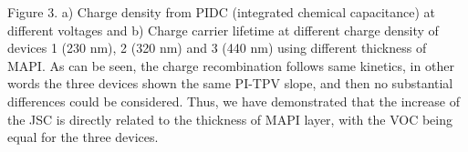 %

Figure 3. a) Charge density from PIDC (integrated chemical capacitance) at different voltages and b) Charge carrier lifetime at different charge density of devices 1 (230 nm), 2 (320 nm) and 3 (440 nm) using different thickness of MAPI.
As can be seen, the charge recombination follows same kinetics, in other words the three devices shown the same PI-TPV slope, and then no substantial differences could be considered. Thus, we have demonstrated that the increase of the JSC is directly related to the thickness of MAPI layer, with the VOC being equal for the three devices.



